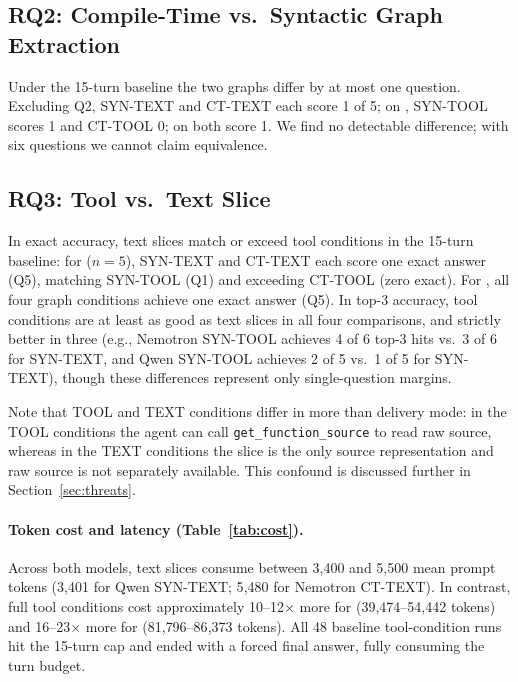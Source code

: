 \subsection{RQ2: Compile-Time vs.\ Syntactic Graph Extraction}
\label{sec:rq2}

Under the 15-turn baseline the two graphs differ by at most one question.
Excluding Q2, \textsc{SYN-TEXT} and \textsc{CT-TEXT} each score 1 of 5; on \qwen, \textsc{SYN-TOOL} scores 1 and \textsc{CT-TOOL} 0; on \nemotron both score 1.
We find no detectable difference; with six questions we cannot claim equivalence.

\subsection{RQ3: Tool vs.\ Text Slice}

In exact accuracy, text slices match or exceed tool conditions in the 15-turn baseline:
for \qwen{} ($n{=}5$), \textsc{SYN-TEXT} and \textsc{CT-TEXT} each score one exact answer (Q5),
matching \textsc{SYN-TOOL} (Q1) and exceeding \textsc{CT-TOOL} (zero exact).
For \nemotron{}, all four graph conditions achieve one exact answer (Q5).
In top-3 accuracy, tool conditions are at least as good as text slices in all four
comparisons, and strictly better in three (e.g., Nemotron \textsc{SYN-TOOL} achieves 4 of 6 top-3 hits vs.\ 3 of 6
for \textsc{SYN-TEXT}, and Qwen \textsc{SYN-TOOL} achieves 2 of 5 vs.\ 1 of 5 for \textsc{SYN-TEXT}),
though these differences represent only single-question margins.

Note that TOOL and TEXT conditions differ in more than delivery mode: in the TOOL conditions
the agent can call \texttt{get\_function\_source} to read raw source, whereas in the TEXT
conditions the slice is the only source representation and raw source is not separately available.
This confound is discussed further in Section~\ref{sec:threats}.

\paragraph{Token cost and latency (Table~\ref{tab:cost}).}
Across both models, text slices consume between 3{,}400 and 5{,}500 mean prompt tokens
(3{,}401 for Qwen \textsc{SYN-TEXT}; 5{,}480 for Nemotron \textsc{CT-TEXT}).
In contrast, full tool conditions cost approximately 10--12$\times$ more for \qwen{} (39{,}474--54{,}442 tokens)
and 16--23$\times$ more for \nemotron{} (81{,}796--86{,}373 tokens).
All 48 baseline tool-condition runs hit the 15-turn cap and ended with a forced final answer,
fully consuming the turn budget.

